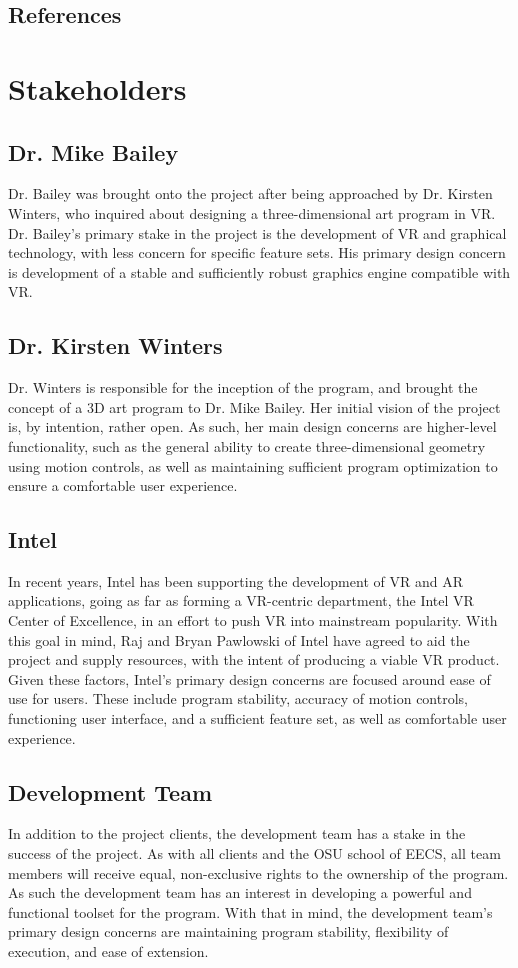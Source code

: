 \documentclass[onecolumn, draftclsnofoot,10pt, compsoc]{IEEEtran}
\begin{document}
\subsection{References}

{}

\section{Stakeholders}

\subsection{Dr. Mike Bailey}
Dr. Bailey was brought onto the project after being approached by Dr. Kirsten Winters, who inquired about designing a three-dimensional art program in VR. Dr. Bailey’s primary stake in the project is the development of VR and graphical technology, with less concern for specific feature sets. His primary design concern is development of a stable and sufficiently robust graphics engine compatible with VR.
\subsection{Dr. Kirsten Winters}
Dr. Winters is responsible for the inception of the program, and brought the concept of a 3D art program to Dr. Mike Bailey. Her initial vision of the project is, by intention, rather open. As such, her main design concerns are higher-level functionality, such as the general ability to create three-dimensional geometry using motion controls, as well as maintaining sufficient program optimization to ensure a comfortable user experience.
\subsection{Intel}
In recent years, Intel has been supporting the development of VR and AR applications, going as far as forming a VR-centric department, the Intel VR Center of Excellence, in an effort to push VR into mainstream popularity. With this goal in mind, Raj and Bryan Pawlowski of Intel have agreed to aid the project and supply resources, with the intent of producing a viable VR product. Given these factors, Intel’s primary design concerns are focused around ease of use for users. These include program stability, accuracy of motion controls, functioning user interface, and a sufficient feature set, as well as comfortable user experience. 
\subsection{Development Team}
In addition to the project clients, the development team has a stake in the success of the project. As with all clients and the OSU school of EECS, all team members will receive equal, non-exclusive rights to the ownership of the program. As such the development team has an interest in developing a powerful and functional toolset for the program. With that in mind, the development team’s primary design concerns are maintaining program stability, flexibility of execution, and ease of extension.
\end{document}
